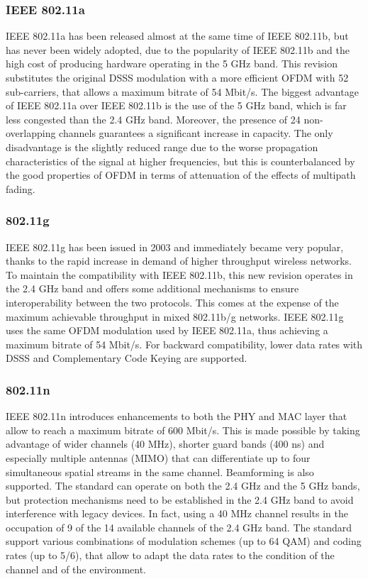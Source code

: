 \subsubsection{IEEE 802.11a}

IEEE 802.11a has been released almost at the same time of IEEE 802.11b, but has never been widely adopted, due to the popularity of IEEE 802.11b and the high cost of producing hardware operating in the 5 GHz band. This revision substitutes the original \gls{DSSS} modulation with a more efficient \gls{OFDM} with 52 sub-carriers, that allows a maximum bitrate of 54 Mbit/s. The biggest advantage of IEEE 802.11a over IEEE 802.11b is the use of the 5 GHz band, which is far less congested than the 2.4 GHz band. Moreover, the presence of 24 non-overlapping channels guarantees a significant increase in capacity. The only disadvantage is the slightly reduced range due to the worse propagation characteristics of the signal at higher frequencies, but this is counterbalanced by the good properties of \gls{OFDM} in terms of attenuation of the effects of multipath fading.

\subsubsection{802.11g}

IEEE 802.11g has been issued in 2003 and immediately became very popular, thanks to the rapid increase in demand of higher throughput wireless networks. To maintain the compatibility with IEEE 802.11b, this new revision operates in the 2.4 GHz band and offers some additional mechanisms to ensure interoperability between the two protocols. This comes at the expense of the maximum achievable throughput in mixed 802.11b/g networks. IEEE 802.11g uses the same \gls{OFDM} modulation used by IEEE 802.11a, thus achieving a maximum bitrate of 54 Mbit/s. For backward compatibility, lower data rates with \gls{DSSS} and Complementary Code Keying are supported.

\subsubsection{802.11n}

IEEE 802.11n introduces enhancements to both the PHY and MAC layer that allow to reach a maximum bitrate of 600 Mbit/s. This is made possible by taking advantage of wider channels (40 MHz), shorter guard bands (400 ns) and especially multiple antennas (MIMO) that can differentiate up to four simultaneous spatial streams in the same channel. Beamforming is also supported. The standard can operate on both the 2.4 GHz and the 5 GHz bands, but protection mechanisms need to be established in the 2.4 GHz band to avoid interference with legacy devices. In fact, using a 40 MHz channel results in the occupation of 9 of the 14 available channels of the 2.4 GHz band. The standard support various combinations of modulation schemes (up to 64 QAM) and coding rates (up to 5/6), that allow to adapt the data rates to the condition of the channel and of the environment.

